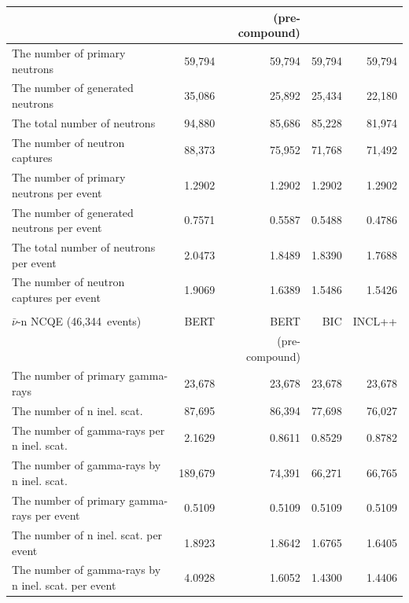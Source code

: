 \begin{table}[h]
\begin{tabular}{lrrrr}
		                                                    &         & (pre-compound) &         &         \\ \hline
		The number of primary neutrons                      &  59,794 &         59,794 &  59,794 &  59,794 \\
		The number of generated neutrons                    &  35,086 &         25,892 &  25,434 &  22,180 \\
		The total number of neutrons                        &  94,880 &         85,686 &  85,228 &  81,974 \\
		The number of neutron captures                      &  88,373 &         75,952 &  71,768 &  71,492 \\ \hline
		The number of primary neutrons per event            &  1.2902 &         1.2902 &  1.2902 &  1.2902 \\
		The number of generated neutrons per event          &  0.7571 &         0.5587 &  0.5488 &  0.4786 \\
		The total number of neutrons per event              &  2.0473 &         1.8489 &  1.8390 &  1.7688 \\
		The number of neutron captures per event            &  1.9069 &         1.6389 &  1.5486 &  1.5426 \\ \hline \hline
		&&& \\ \hline \hline
		$\bar{\nu}$-n NCQE (46,344~events)                  &    BERT &           BERT &     BIC &  INCL++ \\
		                                                    &         & (pre-compound) &         &         \\ \hline
		The number of primary gamma-rays                    &  23,678 &         23,678 &  23,678 &  23,678 \\
		The number of n inel. scat.                         &  87,695 &         86,394 &  77,698 &  76,027 \\
		The number of gamma-rays per n inel. scat.          &  2.1629 &         0.8611 &  0.8529 &  0.8782 \\
		The number of gamma-rays by n inel. scat.           & 189,679 &         74,391 &  66,271 &  66,765 \\ \hline
		The number of primary gamma-rays per event          &  0.5109 &         0.5109 &  0.5109 &  0.5109 \\
		The number of n inel. scat. per event               &  1.8923 &         1.8642 &  1.6765 &  1.6405 \\
		The number of gamma-rays by n inel. scat. per event &  4.0928 &         1.6052 &  1.4300 &  1.4406 \\ \hline \hline
	\end{tabular}
\end{table}





